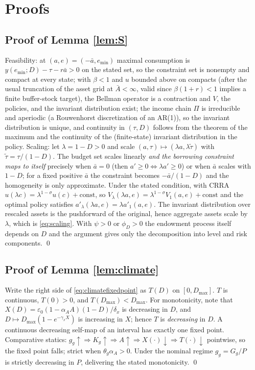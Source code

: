 \documentclass[12pt]{article}
\makeatletter
\newcommand{\FloatBarrier}{\par
    \begingroup\let\@elt\relax
    \edef\reserved@a{\@deferlist}\endgroup
    \ifx\reserved@a\@empty\else\clearpage\fi}
\makeatother
\begin{document}
\appendix
\FloatBarrier
\section{Proofs}\label{app:proofs}

\subsection{Proof of Lemma \ref{lem:S}}
Feasibility: at $(a,e)=(-\bar a, e_{\min})$ maximal consumption is
$y(e_{\min};D)-\tau-r\bar a>0$ on the stated set, so the constraint set
is nonempty and compact at every state; with $\beta<1$ and $u$ bounded above
on compacts (after the usual truncation of the asset grid at
$\bar A<\infty$, valid since $\beta(1+r)<1$ implies a finite buffer-stock
target), the Bellman operator is a contraction and $V$, the policies, and the
invariant distribution exist; the income chain $\Pi$ is irreducible and
aperiodic (a Rouwenhorst discretization of an AR(1)), so the invariant
distribution is unique, and continuity in $(\tau,D)$ follows from the
theorem of the maximum and the continuity of the (finite-state) invariant
distribution in the policy. Scaling: let $\lambda=1-D>0$ and scale
$(a,\tau)\mapsto(\lambda a,\lambda\tilde\tau)$ with
$\tilde\tau=\tau/(1-D)$. The budget set scales linearly \emph{and the
borrowing constraint maps to itself} precisely when $\bar a=0$ (then
$a'\ge0\Leftrightarrow\lambda a'\ge0$) or when $\bar a$ scales with $1-D$;
for a fixed positive $\bar a$ the constraint becomes $-\bar a/(1-D)$ and the
homogeneity is only approximate. Under the stated condition, with CRRA
$u(\lambda c)=\lambda^{1-\sigma}u(c)+\text{const}$, so
$V_\lambda(\lambda a,e)=\lambda^{1-\sigma}V_1(a,e)+\text{const}$ and the
optimal policy satisfies $a'_\lambda(\lambda a,e)=\lambda a'_1(a,e)$. The
invariant distribution over rescaled assets is the pushforward of the
original, hence aggregate assets scale by $\lambda$, which is
\eqref{eq:scaling}. With $\psi>0$ or $\phi_D>0$ the endowment process itself
depends on $D$ and the argument gives only the decomposition into level and
risk components. \qed

\subsection{Proof of Lemma \ref{lem:climate}}
Write the right side of \eqref{eq:climatefixedpoint} as $T(D)$ on
$[0,D_{\max}]$. $T$ is continuous, $T(0)>0$, and $T(D_{\max})<D_{\max}$. For
monotonicity, note that
$X(D)=\varepsilon_0(1-\alpha_A A)(1-D)/\delta_x$ is decreasing in $D$, and
$D\mapsto D_{\max}(1-e^{-\gamma_x X})$ is increasing in $X$; hence $T$ is
\emph{decreasing} in $D$. A continuous decreasing self-map of an interval has
exactly one fixed point. Comparative statics: $g_g\uparrow \Rightarrow
K_g\uparrow \Rightarrow A\uparrow \Rightarrow X(\cdot)\downarrow \Rightarrow
T(\cdot)\downarrow$ pointwise, so the fixed point falls; strict when
$\theta_g\alpha_A>0$. Under the nominal regime $g_g=G_g/P$ is strictly
decreasing in $P$, delivering the stated monotonicity. \qed
\end{document}
